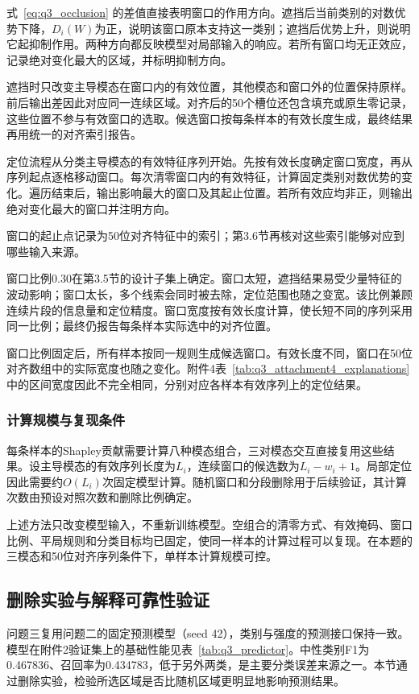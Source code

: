 式~\eqref{eq:q3_occlusion} 的差值直接表明窗口的作用方向。遮挡后当前类别的对数优势下降，$D_i(W)$为正，说明该窗口原本支持这一类别；遮挡后优势上升，则说明它起抑制作用。两种方向都反映模型对局部输入的响应。若所有窗口均无正效应，记录绝对变化最大的区域，并标明抑制方向。

遮挡时只改变主导模态在窗口内的有效位置，其他模态和窗口外的位置保持原样。前后输出差因此对应同一连续区域。对齐后的50个槽位还包含填充或原生零记录，这些位置不参与有效窗口的选取。候选窗口按每条样本的有效长度生成，最终结果再用统一的对齐索引报告。

定位流程从分类主导模态的有效特征序列开始。先按有效长度确定窗口宽度，再从序列起点逐格移动窗口。每次清零窗口内的有效特征，计算固定类别对数优势的变化。遍历结束后，输出影响最大的窗口及其起止位置。若所有效应均非正，则输出绝对变化最大的窗口并注明方向。

窗口的起止点记录为50位对齐特征中的索引；第3.6节再核对这些索引能够对应到哪些输入来源。

窗口比例0.30在第3.5节的设计子集上确定。窗口太短，遮挡结果易受少量特征的波动影响；窗口太长，多个线索会同时被去除，定位范围也随之变宽。该比例兼顾连续片段的信息量和定位精度。窗口宽度按有效长度计算，使长短不同的序列采用同一比例；最终仍报告每条样本实际选中的对齐位置。

窗口比例固定后，所有样本按同一规则生成候选窗口。有效长度不同，窗口在50位对齐数组中的实际宽度也随之变化。附件4表~\ref{tab:q3_attachment4_explanations} 中的区间宽度因此不完全相同，分别对应各样本有效序列上的定位结果。

\subsubsection{计算规模与复现条件}
每条样本的Shapley贡献需要计算八种模态组合，三对模态交互直接复用这些结果。设主导模态的有效序列长度为$L_i$，连续窗口的候选数为$L_i-w_i+1$。局部定位因此需要约$O(L_i)$次固定模型计算。随机窗口和分段删除用于后续验证，其计算次数由预设对照次数和删除比例确定。

上述方法只改变模型输入，不重新训练模型。空组合的清零方式、有效掩码、窗口比例、平局规则和分类目标均已固定，使同一样本的计算过程可以复现。在本题的三模态和50位对齐序列条件下，单样本计算规模可控。

\subsection{删除实验与解释可靠性验证}\label{subsec:q3_faithfulness}
问题三复用问题二的固定预测模型（seed 42），类别与强度的预测接口保持一致。模型在附件2验证集上的基础性能见表~\ref{tab:q3_predictor}。中性类别F1为0.467836、召回率为0.434783，低于另外两类，是主要分类误差来源之一。本节通过删除实验，检验所选区域是否比随机区域更明显地影响预测结果。

